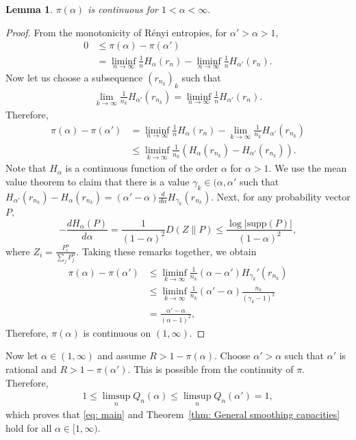 \documentclass{amsart}
\newtheorem{lemma}[theorem]{Lemma}
\theoremstyle{remark}
\begin{document}
\begin{lemma}
    $\pi(\alpha) $ is continuous for $1<\alpha<\infty.$ 
\end{lemma}
\begin{proof}
From the monotonicity of R{\'e}nyi entropies, for $\alpha' > \alpha >1$, 
\begin{align*}
    0 &\leq \pi(\alpha)-\pi(\alpha')\\
    & = \liminf_{n \to \infty}\frac{1}{n}H_{\alpha}(r_n)-\liminf_{n \to \infty}\frac{1}{n}H_{\alpha'}(r_n).
\end{align*}
Now let us choose a subsequence $(r_{n_k})_k$ such that 
\begin{align*}
    \lim_{k\to \infty}\frac{1}{n_k}H_{\alpha'}(r_{n_k}) = \liminf_{n \to \infty}\frac{1}{n}H_{\alpha'}(r_n).
\end{align*}
Therefore, 
\begin{align*}
    \pi(\alpha)-\pi(\alpha') &= \liminf_{n \to \infty}\frac{1}{n}H_{\alpha}(r_n)-\lim_{k \to \infty}\frac{1}{n_k}H_{\alpha'}(r_{n_k})\\
    &\leq \liminf_{k \to \infty}\frac{1}{n_k}(H_{\alpha}(r_{n_k})-H_{\alpha'}(r_{n_k})).
\end{align*}
Note that $H_\alpha$ is a continuous function of the order $\alpha$ for $\alpha>1$. 
We use the mean value theorem to claim that there is a value $\gamma_k\in(\alpha,\alpha'$ such that
$H_{\alpha'}(r_{n_k})-H_{\alpha}(r_{n_k})=(\alpha'-\alpha)\frac{d}{d\alpha}H_{\gamma_k}(r_{n_k}).$
Next, for any probability vector $P$, 
   $$-\frac{dH_{\alpha}(P)}{d\alpha} = \frac{1}{(1-\alpha)^2}D(Z\|P) \leq  \frac{\log|\text{supp}(P)|}{(1-\alpha)^2} , 
   $$
where $Z_i = \frac{P_i^{\alpha}}{\sum_{j}P_j^{\alpha}}.$ Taking these remarks together, we obtain
\begin{align*}
    \pi(\alpha)-\pi(\alpha')&\le \liminf_{k \to \infty}\frac{1}{n_k}(\alpha - \alpha')H_{\gamma_k}'(r_{n_k}) \\
    &\leq \liminf_{k \to \infty}\frac{1}{n_k}(\alpha' - \alpha)\frac{n_k}{(\gamma_k-1)^2} \\
    &= \frac{\alpha' - \alpha}{(\alpha-1)^2},
\end{align*}
Therefore, $\pi(\alpha)$ is continuous on $(1,\infty)$.
\end{proof}
   
Now let $\alpha\in (1,\infty)$ and assume $R > 1-\pi(\alpha)$. Choose $\alpha' > \alpha$ such that $\alpha'$ is rational and $R > 1-\pi(\alpha')$. This is possible from the continuity of $\pi$. Therefore, 
\begin{align*}
    1 \leq \limsup_{n} Q_n(\alpha) \leq\limsup_{n}  Q_n(\alpha') =1,
\end{align*}
which proves that \eqref{eq: main} and Theorem~\ref{thm: General smoothing capacities} hold for all $\alpha \in [1,\infty)$.
\end{document}
